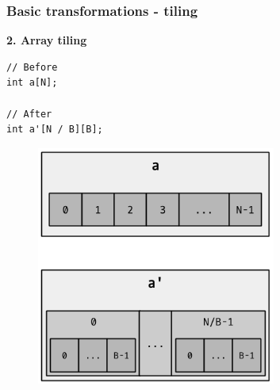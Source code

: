 \begin{frame}[fragile]
\frametitle{Basic transformations - tiling}

\begin{center}
\begin{minipage}{0.3\linewidth}
\textbf{\small 2. Array tiling}
\begin{lstlisting}[style=Cstyle, basicstyle=\scriptsize]
// Before
int a[N];

// After
int a'[N / B][B];
\end{lstlisting}
\end{minipage}%
\begin{minipage}{0.5\linewidth}
\begin{figure}
	\centering
	\includegraphics[width=0.7\textwidth]{images/tiling}
\end{figure}
\end{minipage}
\end{center}

\end{frame}



